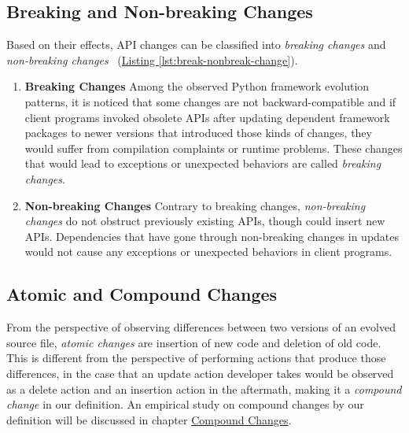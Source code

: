 \subsection{Breaking and Non-breaking Changes}

Based on their effects, API changes can be classified into \textit{breaking changes} and \textit{non-breaking changes}~\cite{api-evo-refactoring} (\hyperref[lst:break-nonbreak-change]{Listing \ref*{lst:break-nonbreak-change}}).

\begin{enumerate}
	\item \textbf{Breaking Changes} Among the observed Python framework evolution patterns, it is noticed that some changes are not backward-compatible and if client programs invoked obsolete APIs after updating dependent framework packages to newer versions that introduced those kinds of changes, they would suffer from compilation complaints or runtime problems. These changes that would lead to exceptions or unexpected behaviors are called \textit{breaking changes}.
	\item \textbf{Non-breaking Changes} Contrary to breaking changes, \textit{non-breaking changes} do not obstruct previously existing APIs, though could insert new APIs. Dependencies that have gone through non-breaking changes in updates would not cause any exceptions or unexpected behaviors in client programs.
\end{enumerate}

\begin{figure}[!t]
	
	\vspace{-5mm}
\end{figure}

\subsection{Atomic and Compound Changes}

From the perspective of observing differences between two versions of an evolved source file, \textit{atomic changes} are insertion of new code and deletion of old code. This is different from the perspective of performing actions that produce those differences, in the case that an update action developer takes would be observed as a delete action and an insertion action in the aftermath, making it a \textit{compound change} in our definition. An empirical study on compound changes by our definition will be discussed in chapter \hyperref[chap:compound-changes]{Compound Changes}.

